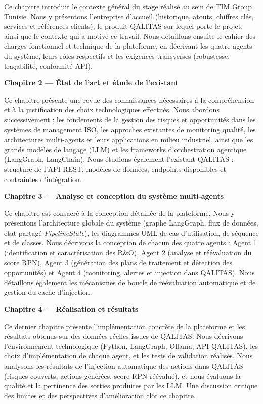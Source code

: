 Ce chapitre introduit le contexte général du stage réalisé au sein de TIM Group Tunisie. Nous y présentons l'entreprise d'accueil (historique, atouts, chiffres clés, services et références clients), le produit QALITAS sur lequel porte le projet, ainsi que le contexte qui a motivé ce travail. Nous détaillons ensuite le cahier des charges fonctionnel et technique de la plateforme, en décrivant les quatre agents du système, leurs rôles respectifs et les exigences transverses (robustesse, traçabilité, conformité API).

\vspace{0.8em}
\noindent\textbf{Chapitre 2 — État de l'art et étude de l'existant}

Ce chapitre présente une revue des connaissances nécessaires à la compréhension et à la justification des choix technologiques effectués. Nous abordons successivement : les fondements de la gestion des risques et opportunités dans les systèmes de management ISO, les approches existantes de monitoring qualité, les architectures multi-agents et leurs applications en milieu industriel, ainsi que les grands modèles de langage (LLM) et les frameworks d'orchestration agentique (LangGraph, LangChain). Nous étudions également l'existant QALITAS : structure de l'API REST, modèles de données, endpoints disponibles et contraintes d'intégration.

\vspace{0.8em}
\noindent\textbf{Chapitre 3 — Analyse et conception du système multi-agents}

Ce chapitre est consacré à la conception détaillée de la plateforme. Nous y présentons l'architecture globale du système (graphe LangGraph, flux de données, état partagé \textit{PipelineState}), les diagrammes UML de cas d'utilisation, de séquence et de classes. Nous décrivons la conception de chacun des quatre agents : Agent 1 (identification et caractérisation des R\&O), Agent 2 (analyse et réévaluation du score RPN), Agent 3 (génération des plans de traitement et détection des opportunités) et Agent 4 (monitoring, alertes et injection dans QALITAS). Nous détaillons également les mécanismes de boucle de réévaluation automatique et de gestion du cache d'injection.

\vspace{0.8em}
\noindent\textbf{Chapitre 4 — Réalisation et résultats}

Ce dernier chapitre présente l'implémentation concrète de la plateforme et les résultats obtenus sur des données réelles issues de QALITAS. Nous décrivons l'environnement technologique (Python, LangGraph, Ollama, API QALITAS), les choix d'implémentation de chaque agent, et les tests de validation réalisés. Nous analysons les résultats de l'injection automatique des actions dans QALITAS (risques couverts, actions générées, score RPN réévalué), et nous évaluons la qualité et la pertinence des sorties produites par les LLM. Une discussion critique des limites et des perspectives d'amélioration clôt ce chapitre.

